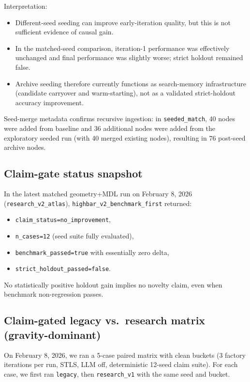 \documentclass[11pt]{article}
\begin{document}
Interpretation:
\begin{itemize}
\item Different-seed seeding can improve early-iteration quality, but this is not sufficient evidence of causal gain.
\item In the matched-seed comparison, iteration-1 performance was effectively unchanged and final performance was slightly worse; strict holdout remained false.
\item Archive seeding therefore currently functions as search-memory infrastructure (candidate carryover and warm-starting), not as a validated strict-holdout accuracy improvement.
\end{itemize}
Seed-merge metadata confirms recursive ingestion: in \texttt{seeded\_match}, 40 nodes were added from baseline and 36 additional nodes were added from the exploratory seeded run (with 40 merged existing nodes), resulting in 76 post-seed archive nodes.

\subsection{Claim-gate status snapshot}
In the latest matched geometry+MDL run on February 8, 2026 (\texttt{research\_v2\_atlas}), \texttt{highbar\_v2\_benchmark\_first} returned:
\begin{itemize}
\item \texttt{claim\_status=no\_improvement},
\item \texttt{n\_cases=12} (seed suite fully evaluated),
\item \texttt{benchmark\_passed=true} with essentially zero delta,
\item \texttt{strict\_holdout\_passed=false}.
\end{itemize}
No statistically positive holdout gain implies no novelty claim, even when benchmark non-regression passes.

\subsection{Claim-gated legacy vs.\ research matrix (gravity-dominant)}
On February 8, 2026, we ran a 5-case paired matrix with clean buckets (3 factory iterations per run, STLS, LLM off, deterministic 12-seed claim suite). For each case, we first ran \texttt{legacy}, then \texttt{research\_v1} with the same seed and bucket.
\end{document}
